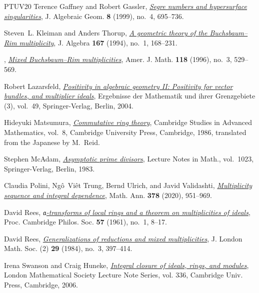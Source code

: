 \documentclass[a4paper, 11pt]{amsart}
\theoremstyle{definition}
\begin{document}
\begin{thebibliography}{PTUV20}
		Terence Gaffney and Robert Gassler,
		\emph{\href{https://arxiv.org/abs/alg-geom/9611002}{Segre numbers and
				hypersurface singularities}}, J. Algebraic Geom. \textbf{8} (1999), no.~4,
		695--736.
		
		Steven~L. Kleiman and Anders Thorup,
		\emph{\href{https://doi.org/10.1006/jabr.1994.1182}{A geometric theory of the
				Buchsbaum--Rim multiplicity}}, J. Algebra \textbf{167} (1994), no.~1,
		168--231.
		
		\bysame, \emph{\href{https://arxiv.org/abs/alg-geom/9412019}{Mixed
				Buchsbaum--Rim multiplicities}}, Amer. J. Math. \textbf{118} (1996), no.~3,
		529--569.
		
		Robert Lazarsfeld,
		\emph{\href{https://doi.org/10.1007/978-3-642-18810-7}{Positivity in
				algebraic geometry II: Positivity for vector bundles, and multiplier
				ideals}}, Ergebnisse der Mathematik und ihrer Grenzgebiete (3), vol.~49,
		Springer-Verlag, Berlin, 2004.
		
		Hideyuki Matsumura,
		\emph{\href{https://doi.org/10.1017/CBO9781139171762}{Commutative ring
				theory}}, Cambridge Studies in Advanced Mathematics, vol.~8,
		Cambridge University Press, Cambridge, 1986, translated from the Japanese
		by M.~Reid.
		
		Stephen McAdam,
		\emph{\href{https://doi.org/10.1007/BFb0071575}{Asymptotic prime divisors}},
		Lecture Notes in Math., vol.~1023, Springer-Verlag, Berlin, 1983.
		
		Claudia Polini, Ng{\^o}~Vi{\^e}t Trung, Bernd Ulrich, and Javid Validashti,
		\emph{\href{https://doi.org/10.1007/s00208-020-02059-5}{Multiplicity sequence
				and integral dependence}}, Math. Ann. \textbf{378} (2020), 951--969.
		
		David Rees,
		\emph{\href{https://doi.org/10.1017/S0305004100034800}{$\mathfrak{a}$-transforms
				of local rings and a theorem on multiplicities of ideals}},
		Proc. Cambridge Philos. Soc. \textbf{57} (1961), no.~1, 8--17.
		
		David Rees,
		\emph{\href{https://doi.org/10.1112/jlms/s2-29.3.397}{Generalizations of
				reductions and mixed multiplicities}}, J. London Math. Soc. (2)
		\textbf{29} (1984), no.~3, 397--414.
		
		Irena Swanson and Craig Huneke,
		\emph{\href{https://www.math.purdue.edu/~iswanso/book/index.html}{Integral
				closure of ideals, rings, and modules}}, London Mathematical Society Lecture
		Note Series, vol. 336, Cambridge Univ. Press, Cambridge, 2006.
		

\end{thebibliography}
\end{document}
